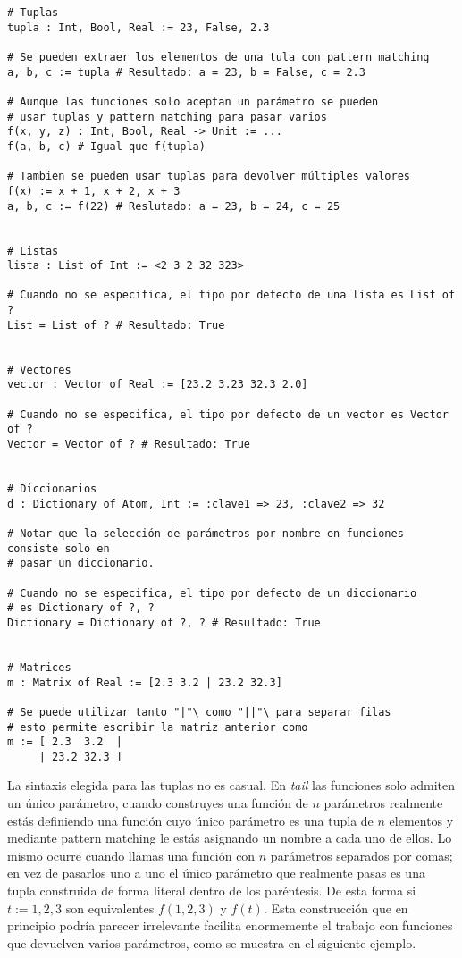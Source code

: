 \begin{lstlisting}[style=tail, caption={Estructuras de datos}]
# Tuplas
tupla : Int, Bool, Real := 23, False, 2.3

# Se pueden extraer los elementos de una tula con pattern matching
a, b, c := tupla # Resultado: a = 23, b = False, c = 2.3

# Aunque las funciones solo aceptan un parámetro se pueden
# usar tuplas y pattern matching para pasar varios
f(x, y, z) : Int, Bool, Real -> Unit := ...
f(a, b, c) # Igual que f(tupla)

# Tambien se pueden usar tuplas para devolver múltiples valores
f(x) := x + 1, x + 2, x + 3
a, b, c := f(22) # Reslutado: a = 23, b = 24, c = 25


# Listas
lista : List of Int := <2 3 2 32 323>

# Cuando no se especifica, el tipo por defecto de una lista es List of ?
List = List of ? # Resultado: True


# Vectores
vector : Vector of Real := [23.2 3.23 32.3 2.0]

# Cuando no se especifica, el tipo por defecto de un vector es Vector of ?
Vector = Vector of ? # Resultado: True


# Diccionarios
d : Dictionary of Atom, Int := :clave1 => 23, :clave2 => 32

# Notar que la selección de parámetros por nombre en funciones consiste solo en
# pasar un diccionario.

# Cuando no se especifica, el tipo por defecto de un diccionario
# es Dictionary of ?, ?
Dictionary = Dictionary of ?, ? # Resultado: True


# Matrices
m : Matrix of Real := [2.3 3.2 | 23.2 32.3]

# Se puede utilizar tanto "|"\ como "||"\ para separar filas
# esto permite escribir la matriz anterior como
m := [ 2.3  3.2  |
     | 23.2 32.3 ]
\end{lstlisting}

La sintaxis elegida para las tuplas no es casual. En \textit{tail} las funciones solo admiten un único parámetro, cuando construyes una función de $n$ parámetros realmente estás definiendo una función cuyo único parámetro es una tupla de $n$ elementos y mediante pattern matching le estás asignando un nombre a cada uno de ellos. Lo mismo ocurre cuando llamas una función con $n$ parámetros separados por comas; en vez de pasarlos uno a uno el único parámetro que realmente pasas es una tupla construida de forma literal dentro de los paréntesis. De esta forma si $t := 1, 2, 3$ son equivalentes $f(1, 2, 3)$ y $f(t)$. Esta construcción que en principio podría parecer irrelevante facilita enormemente el trabajo con funciones que devuelven varios parámetros, como se muestra en el siguiente ejemplo.\\

